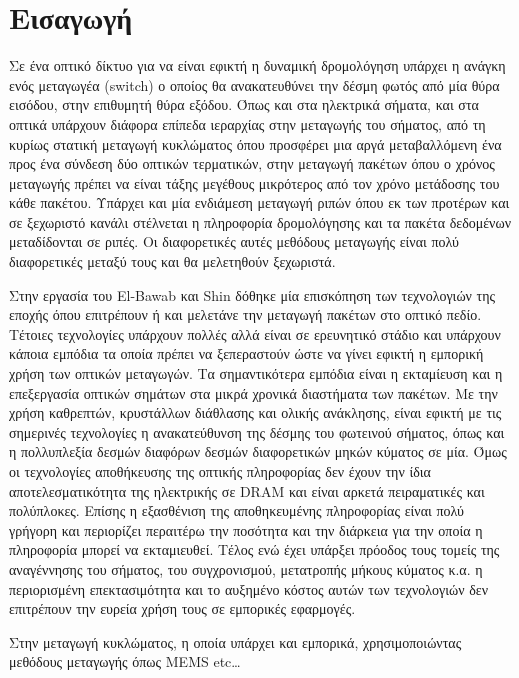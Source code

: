\section{Εισαγωγή}

Σε ένα οπτικό δίκτυο για να είναι εφικτή η δυναμική δρομολόγηση
υπάρχει η ανάγκη ενός μεταγωγέα (switch) ο οποίος θα ανακατευθύνει την
δέσμη φωτός από μία θύρα εισόδου, στην επιθυμητή θύρα εξόδου. Όπως και
στα ηλεκτρικά σήματα, και στα οπτικά υπάρχουν διάφορα επίπεδα
ιεραρχίας στην μεταγωγής του σήματος, από τη κυρίως στατική μεταγωγή
κυκλώματος όπου προσφέρει μια αργά μεταβαλλόμενη ένα προς ένα σύνδεση
δύο οπτικών τερματικών, στην μεταγωγή πακέτων όπου ο χρόνος μεταγωγής
πρέπει να είναι τάξης μεγέθους μικρότερος από τον χρόνο μετάδοσης του
κάθε πακέτου. Υπάρχει και μία ενδιάμεση μεταγωγή ριπών όπου εκ των
προτέρων και σε ξεχωριστό κανάλι στέλνεται η πληροφορία δρομολόγησης
και τα πακέτα δεδομένων μεταδίδονται σε ριπές. Οι διαφορετικές αυτές
μεθόδους μεταγωγής είναι πολύ διαφορετικές μεταξύ τους και θα
μελετηθούν ξεχωριστά.


Στην εργασία του El-Bawab και Shin \cite{} δόθηκε μία επισκόπηση των
τεχνολογιών της εποχής όπου επιτρέπουν ή και μελετάνε την μεταγωγή
πακέτων στο οπτικό πεδίο. Τέτοιες τεχνολογίες υπάρχουν πολλές αλλά
είναι σε ερευνητικό στάδιο και υπάρχουν κάποια εμπόδια τα οποία πρέπει
να ξεπεραστούν ώστε να γίνει εφικτή η εμπορική χρήση των οπτικών
μεταγωγών. Τα σημαντικότερα εμπόδια είναι η εκταμίευση και η
επεξεργασία οπτικών σημάτων στα μικρά χρονικά διαστήματα των
πακέτων. Με την χρήση καθρεπτών, κρυστάλλων διάθλασης και ολικής
ανάκλησης, είναι εφικτή με τις σημερινές τεχνολογίες η ανακατεύθυνση
της δέσμης του φωτεινού σήματος, όπως και η πολλυπλεξία δεσμών
διαφόρων δεσμών διαφορετικών μηκών κύματος σε μία. Όμως οι τεχνολογίες
αποθήκευσης της οπτικής πληροφορίας δεν έχουν την ίδια
αποτελεσματικότητα της ηλεκτρικής σε DRAM και είναι αρκετά
πειραματικές και πολύπλοκες. Επίσης η εξασθένιση της αποθηκευμένης
πληροφορίας είναι πολύ γρήγορη και περιορίζει περαιτέρω την ποσότητα
και την διάρκεια για την οποία η πληροφορία μπορεί να
εκταμιευθεί. Τέλος ενώ έχει υπάρξει πρόοδος τους τομείς της
αναγέννησης του σήματος, του συγχρονισμού, μετατροπής μήκους κύματος
κ.α. η περιορισμένη επεκτασιμότητα και το αυξημένο κόστος αυτών των
τεχνολογιών δεν επιτρέπουν την ευρεία χρήση τους σε εμπορικές
εφαρμογές.



Στην μεταγωγή κυκλώματος, η οποία υπάρχει και εμπορικά,
χρησιμοποιώντας μεθόδους μεταγωγής όπως MEMS etc\ldots



